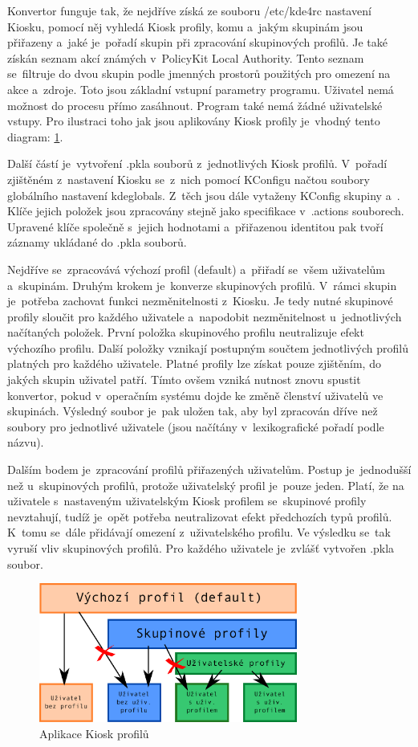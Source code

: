Konvertor funguje tak, že nejdříve získá ze souboru /etc/kde4rc nastavení Kiosku, pomocí něj vyhledá Kiosk profily, komu a~jakým skupinám jsou přiřazeny a~jaké je~pořadí skupin při zpracování skupinových profilů. Je také získán seznam akcí známých v~PolicyKit Local Authority. Tento seznam se~filtruje do dvou skupin podle jmenných prostorů použitých pro omezení na akce a~zdroje. Toto jsou základní vstupní parametry programu. Uživatel nemá možnost do procesu přímo zasáhnout. Program také nemá žádné uživatelské vstupy. Pro ilustraci toho jak jsou aplikovány Kiosk profily je~vhodný tento diagram: \ref{fig:konv_profily}.

Další částí je~vytvoření .pkla souborů z~jednotlivých Kiosk profilů. V~pořadí zjištěném z~nastavení Kiosku se~z~nich pomocí KConfigu načtou soubory globálního nastavení kdeglobals. Z~těch jsou dále vytaženy KConfig skupiny  a~. Klíče jejich položek jsou zpracovány stejně jako specifikace v~.actions souborech. Upravené klíče společně s~jejich hodnotami a~přiřazenou identitou pak tvoří záznamy ukládané do .pkla souborů.

Nejdříve se~zpracovává výchozí profil (default) a~přiřadí se~všem uživatelům a~skupinám. Druhým krokem je~konverze skupinových profilů. V~rámci skupin je~potřeba zachovat funkci nezměnitelnosti z~Kiosku. Je tedy nutné skupinové profily sloučit pro každého uživatele a~napodobit nezměnitelnost u~jednotlivých načítaných položek. První položka skupinového profilu neutralizuje efekt výchozího profilu. Další položky vznikají postupným součtem jednotlivých profilů platných pro každého uživatele. Platné profily lze získat pouze zjištěním, do jakých skupin uživatel patří. Tímto ovšem vzniká nutnost znovu spustit konvertor, pokud v~operačním systému dojde ke změně členství uživatelů ve skupinách. Výsledný soubor je~pak uložen tak, aby byl zpracován dříve než soubory pro jednotlivé uživatele (jsou načítány v~lexikografické pořadí podle názvu).

Dalším bodem je~zpracování profilů přiřazených uživatelům. Postup je~jednodušší než u~skupinových profilů, protože uživatelský profil je~pouze jeden. Platí, že na uživatele s~nastaveným uživatelským Kiosk profilem se~skupinové profily nevztahují, tudíž je~opět potřeba neutralizovat efekt předchozích typů profilů. K~tomu se~dále přidávají omezení z~uživatelského profilu. Ve výsledku se~tak vyruší vliv skupinových profilů. Pro každého uživatele je~zvlášť vytvořen .pkla soubor.

\begin{figure}[h]
    \centering
    \includegraphics[width=8.5cm]{obrazky/profily.pdf}
    \caption{Aplikace Kiosk profilů}
    \label{fig:konv_profily}
\end{figure}

